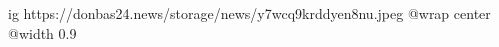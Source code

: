  
 
 
 
 

\ifcmt
  ig https://donbas24.news/storage/news/y7wcq9krddyen8nu.jpeg
  @wrap center
  @width 0.9
\fi
